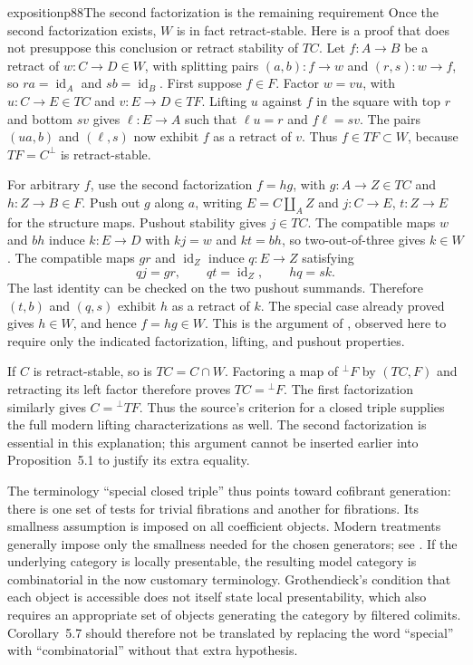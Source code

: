 \begin{dcomment}{exposition}{p88}{The second factorization is the remaining requirement}
Once the second factorization exists, $W$ is in fact retract-stable. Here is a proof that does not presuppose this conclusion or retract stability of $TC$. Let $f:A\to B$ be a retract of $w:C\to D\in W$, with splitting pairs $(a,b):f\to w$ and $(r,s):w\to f$, so $ra=\operatorname{id}_A$ and $sb=\operatorname{id}_B$. First suppose $f\in F$. Factor $w=vu$, with $u:C\to E\in TC$ and $v:E\to D\in TF$. Lifting $u$ against $f$ in the square with top $r$ and bottom $sv$ gives $\ell:E\to A$ such that $\ell u=r$ and $f\ell=sv$. The pairs $(ua,b)$ and $(\ell,s)$ now exhibit $f$ as a retract of $v$. Thus $f\in TF\subset W$, because $TF=C^{\perp}$ is retract-stable.

For arbitrary $f$, use the second factorization $f=hg$, with $g:A\to Z\in TC$ and $h:Z\to B\in F$. Push out $g$ along $a$, writing $E=C\amalg_A Z$ and $j:C\to E$, $t:Z\to E$ for the structure maps. Pushout stability gives $j\in TC$. The compatible maps $w$ and $bh$ induce $k:E\to D$ with $kj=w$ and $kt=bh$, so two-out-of-three gives $k\in W$. The compatible maps $gr$ and $\operatorname{id}_Z$ induce $q:E\to Z$ satisfying
\[
 qj=gr,\qquad qt=\operatorname{id}_Z,\qquad hq=sk.
\]
The last identity can be checked on the two pushout summands. Therefore $(t,b)$ and $(q,s)$ exhibit $h$ as a retract of $k$. The special case already proved gives $h\in W$, and hence $f=hg\in W$. This is the argument of \citet[Lemma~11.3.3]{Riehl2014}, observed here to require only the indicated factorization, lifting, and pushout properties.

If $C$ is retract-stable, so is $TC=C\cap W$. Factoring a map of ${}^{\perp}F$ by $(TC,F)$ and retracting its left factor therefore proves $TC={}^{\perp}F$. The first factorization similarly gives $C={}^{\perp}TF$. Thus the source's criterion for a closed triple supplies the full modern lifting characterizations as well. The second factorization is essential in this explanation; this argument cannot be inserted earlier into Proposition~5.1 to justify its extra equality.

The terminology ``special closed triple'' thus points toward cofibrant generation: there is one set of tests for trivial fibrations and another for fibrations. Its smallness assumption is imposed on all coefficient objects. Modern treatments generally impose only the smallness needed for the chosen generators; see \citet[Theorem~2.1.14 and Definition~2.1.17]{Hovey1999}. If the underlying category is locally presentable, the resulting model category is combinatorial in the now customary terminology. Grothendieck's condition that each object is accessible does not itself state local presentability, which also requires an appropriate set of objects generating the category by filtered colimits. Corollary~5.7 should therefore not be translated by replacing the word ``special'' with ``combinatorial'' without that extra hypothesis.
\end{dcomment}


